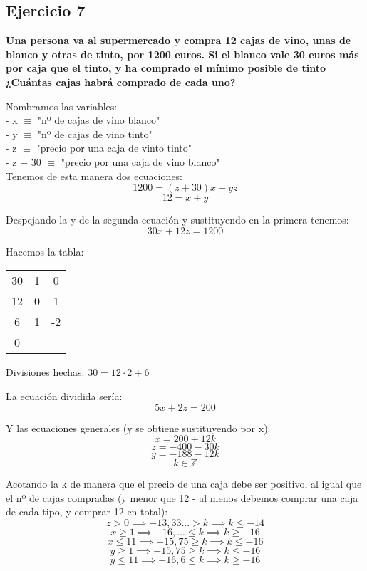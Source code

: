 \documentclass[11pt, a4paper, titlepage]{article}
\providecommand{\ent}{\mathbb{Z}}
\begin{document}
\subsection{\LARGE{Ejercicio 7}}

\textbf{Una persona va al supermercado y compra 12 cajas de vino, unas de blanco y otras de tinto, por 1200 euros. Si el blanco vale 30 euros más por caja que el tinto, y ha comprado el mínimo posible de tinto ¿Cuántas cajas habrá comprado de cada uno?}

Nombramos las variables: \\
- x $\equiv$ "nº de cajas de vino blanco" \\
- y $\equiv$ "nº de cajas de vino tinto" \\
- z $\equiv$ "precio por una caja de vinto tinto" \\
- z + 30 $\equiv$ "precio por una caja de vino blanco" \\

Tenemos de esta manera dos ecuaciones:
$$ 1200 = (z + 30)x + yz $$
$$ 12 = x + y $$

Despejando la y de la segunda ecuación y sustituyendo en la primera tenemos:
$$ 30x + 12z = 1200 $$

Hacemos la tabla:

\begin{center}
\begin{tabular}{c|cc}
30 & 1 & 0 \\
12 & 0 & 1 \\
\hline
6 & 1 & -2 \\
\hline
0
\end{tabular}
\end{center}

Divisiones hechas: $ 30 = 12 \cdot 2 + 6 $

La ecuación dividida sería:
$$ 5x + 2z = 200 $$

Y las ecuaciones generales (y se obtiene sustituyendo por x):
$$ x = 200 + 12k $$
$$ z = -400 - 30k $$
$$ y = -188 - 12k $$
$$ k \in \ent $$

Acotando la k de manera que el precio de una caja debe ser positivo, al igual que el nº de cajas compradas (y menor que 12 - al menos debemos comprar una caja de cada tipo, y comprar 12 en total):
$$ z > 0 \implies -13,33... > k \implies k \leq -14 $$
$$ x \geq 1 \implies -16,... \leq k \implies k \geq -16 $$
$$ x \leq 11 \implies -15,75 \geq k \implies k \leq -16 $$
$$ y \geq 1 \implies -15,75 \geq k \implies k \leq -16 $$
$$ y \leq 11 \implies -16,6 \leq k \implies k \geq -16 $$
\end{document}
